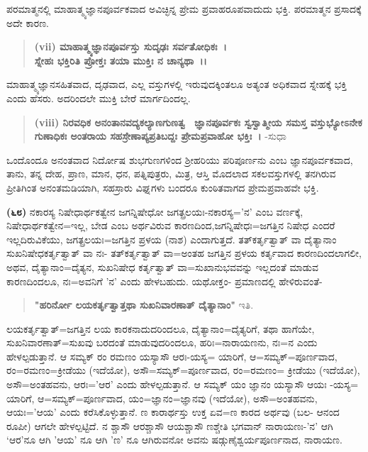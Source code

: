 ಪರಮಾತ್ಮನಲ್ಲಿ ಮಾಹಾತ್ಮ್ಯಜ್ಞಾನಪೂರ್ವಕವಾದ ಅವಿಚ್ಛಿನ್ನ ಪ್ರೇಮ ಪ್ರವಾಹರೂಪ\-ವಾದುದು ಭಕ್ತಿ. ಪರಮಾತ್ಮನ ಪ್ರಸಾದಕ್ಕೆ ಅದೇ ಕಾರಣ.

\begin{verse}
\textbf{(vii) ಮಾಹಾತ್ಮ್ಯಜ್ಞಾನಪೂರ್ವಸ್ತು ಸುದೃಢಃ ಸರ್ವತೋಧಿಕಃ~।}\\\textbf{ಸ್ನೇಹಃ ಭಕ್ತಿರಿತಿ ಪ್ರೋಕ್ತಃ ತಯಾ ಮುಕ್ತಿಃ ನ ಚಾನ್ಯಥಾ~।।}
\end{verse}


\vskip 3pt

ಮಾಹಾತ್ಮ್ಯಜ್ಞಾನಸಹಿತವಾದ, ದೃಢವಾದ, ಎಲ್ಲ ವಸ್ತುಗಳಲ್ಲಿ ಇರುವುದಕ್ಕಿಂತಲೂ ಅತ್ಯಂತ ಅಧಿಕವಾದ ಸ್ನೇಹಕ್ಕೆ ಭಕ್ತಿ ಎಂದು ಹೆಸರು. ಅದರಿಂದಲೇ ಮುಕ್ತಿ ಬೇರೆ ಮಾರ್ಗದಿಂದಲ್ಲ.

\begin{verse}
\textbf{(viii) ನಿರವಧಿಕ ಅನಂತಾನವದ್ಯಕಲ್ಯಾಣಗುಣತ್ವ \, ಜ್ಞಾನಪೂರ್ವಕಃ ಸ್ವಸ್ವಾತ್ಮೀಯ ಸಮಸ್ತ ವಸ್ತುಭ್ಯೋಽನೇಕ ಗುಣಾಧಿಕಃ ಅಂತರಾಯ ಸಹಸ್ರೇಣಾಪ್ಯ\-ಪ್ರತಿಬದ್ದಃ ಪ್ರೇಮಪ್ರವಾಹೋ ಭಕ್ತಿಃ~।} -ಸುಧಾ
\end{verse}

ಒಂದೊಂದೂ ಅನಂತವಾದ ನಿರ್ದೋಷ ಶುಭಗುಣಗಳಿಂದ ಶ‍್ರೀಹರಿಯು ಪರಿಪೂರ್ಣನು ಎಂಬ ಜ್ಞಾನಪೂರ್ವಕವಾದ, ತಾನು, ತನ್ನ ದೇಹ, ಪ್ರಾಣ, ಮಾನ, ಧನ, ಪತ್ನಿಪುತ್ರರು, ಮಿತ್ರ, ಆಸ್ತಿ ಮೊದಲಾದ ಸಕಲವಸ್ತುಗಳಲ್ಲಿ ತನಗಿರುವ ಪ್ರೀತಿಗಿಂತ ಅನಂತಮಡಿಯಾಗಿ, ಸಹಸ್ರಾರು ವಿಘ್ನಗಳು ಬಂದರೂ ಕುಂಠಿತವಾಗದ ಪ್ರೇಮಪ್ರವಾಹವೇ ಭಕ್ತಿ.

\textbf{(೬೮)} ನಕಾರಸ್ಯ ನಿಷೇಧಾರ್ಥಕತ್ವೇನ ಜಗನ್ನಿಷೇಧೋ ಜಗತ್ಪ್ರಲಯಃ-ನಕಾರಸ್ಯ='ನ' ಎಂಬ ವರ್ಣಕ್ಕೆ, ನಿಷೇಧಾರ್ಥಕತ್ವೇನ=ಇಲ್ಲ, ಬೇಡ ಎಂಬ ಅರ್ಥವಿರುವ ಕಾರಣದಿಂದ,\break ಜಗನ್ನಿಷೇಧಃ=ಜಗತ್ತಿನ ನಿಷೇಧ ಎಂದರೆ ಇಲ್ಲದಿರುವಿಕೆಯು, ಜಗತ್ಪ್ರಲಯಃ=ಜಗತ್ತಿನ ಪ್ರಳಯ (ನಾಶ) ಎಂದಾಗುತ್ತದೆ. ತತ್‌ಕರ್ತೃತ್ವಾತ್ ವಾ ದೈತ್ಯಾನಾಂ ಸುಖನಿಷೇಧಕರ್ತೃತ್ವಾತ್ ವಾ ನಃ- ತತ್‌ಕರ್ತೃತ್ವಾತ್ ವಾ=ಅಂತಹ ಜಗತ್ತಿನ ಪ್ರಳಯ ಕರ್ತೃವಾದ ಕಾರಣದಿಂದಲಾಗಲೀ, ಅಥವ, ದೈತ್ಯಾನಾಂ=ದೈತ್ಯನ, ಸುಖನಿಷೇಧ ಕರ್ತೃತ್ವಾತ್ ವಾ=ಸುಖಾನುಭವವನ್ನು ಇಲ್ಲದಂತೆ ಮಾಡುವ ಕಾರಣದಿಂದಲೂ, ನಃ=ಅವನಿಗೆ 'ನ' ಎಂದು ಹೇಳಬಹುದು. ಯಥೋಕ್ತಂ- ಪ್ರಮಾಣದಲ್ಲಿ ಹೇಳಿರುವಂತೆ-

\begin{verse}
\textbf{"ಹರಿರ್ನೋ ಲಯಕರ್ತೃತ್ವಾತ್ತಥಾ ಸುಖನಿವಾರಣಾತ್ ದೈತ್ಯಾನಾಂ"} ಇತಿ.
\end{verse}

ಲಯಕರ್ತೃತ್ವಾತ್=ಜಗತ್ತಿನ ಲಯ ಕಾರಕನಾದುದರಿಂದಲೂ, ದೈತ್ಯಾನಾಂ=ದೈತ್ಯರಿಗೆ, ತಥಾ ಹಾಗೆಯೇ, ಸುಖನಿವಾರಣಾತ್=ಸುಖವು ಬರದಂತೆ ಮಾಡುವುದರಿಂದಲೂ, ಹರಿಃ=\-ನಾರಾಯಣನು, ನಃ=ನ ಎಂದು ಹೇಳಲ್ಪಡುತ್ತಾನೆ. ಆ ಸಮ್ಯಕ್ ರಂ ರಮಣಂ ಯಸ್ಯಾಸೌ ಆರಃ-ಯಸ್ಯ= ಯಾರಿಗೆ, ಆ=ಸಮ್ಯಕ್=ಪೂರ್ಣವಾದ, ರಂ=ರಮಣಂ=ಕ್ರೀಡೆಯು (ಇದೆಯೋ), ಅಸೌ=ಸಮ್ಯಕ್=ಪೂರ್ಣವಾದ, ರಂ=ರಮಣಂ= ಕ್ರೀಡೆಯು (ಇದೆಯೋ), ಅಸೌ=ಅಂತಹ\-ವನು, ಆರಃ='ಆರ' ಎಂದು ಹೇಳಲ್ಪಡುತ್ತಾನೆ. ಆ ಸಮ್ಯಕ್ ಯಂ ಜ್ಞಾನಂ ಯಸ್ಯಾಸೌ ಆಯಃ -ಯಸ್ಯ= ಯಾರಿಗೆ, ಆ=ಸಮ್ಯಕ್=ಪೂರ್ಣವಾದ, ಯಂ=ಜ್ಞಾನಂ=ಜ್ಞಾನವು (ಇದೆಯೋ), ಅಸೌ=ಅಂತಹವನು, ಆಯಃ='ಆಯ' ಎಂದು ಕರೆಸಿಕೊಳ್ಳುತ್ತಾನೆ. ಣ ಕಾರಾರ್ಥಸ್ತು ಉಕ್ತ ಏವ=ಣ ಕಾರದ ಅರ್ಥವು (ಬಲ- ಆನಂದ ರೂಪೀ) ಆಗಲೇ ಹೇಳಲ್ಪಟ್ಟಿದೆ. ನ ಶ್ಚಾಸೌ ಆರಶ್ಚಾಸೌ‌ ಆಯಶ್ಚಾಸೌ ಣಶ್ಚೇತಿ ಭಗವಾನ್ ನಾರಾಯಣಃ-'ನ' ಆಗಿ `ಆರ'ನೂ ಆಗಿ 'ಆಯ' ನೂ ಆಗಿ 'ಣ' ನೂ ಆಗಿರುವನೋ ಅವನು ಷಡ್ಗುಣೈಶ್ವರ್ಯಪೂರ್ಣನಾದ, ನಾರಾಯಣ.

